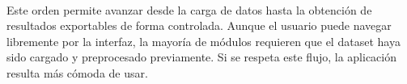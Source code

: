 \paragraph*{}Este orden permite avanzar desde la carga de datos hasta la obtención de resultados exportables de forma controlada. Aunque el usuario puede navegar libremente por la interfaz, la mayoría de módulos requieren que el dataset haya sido cargado y preprocesado previamente. Si se respeta este flujo, la aplicación resulta más cómoda de usar.

